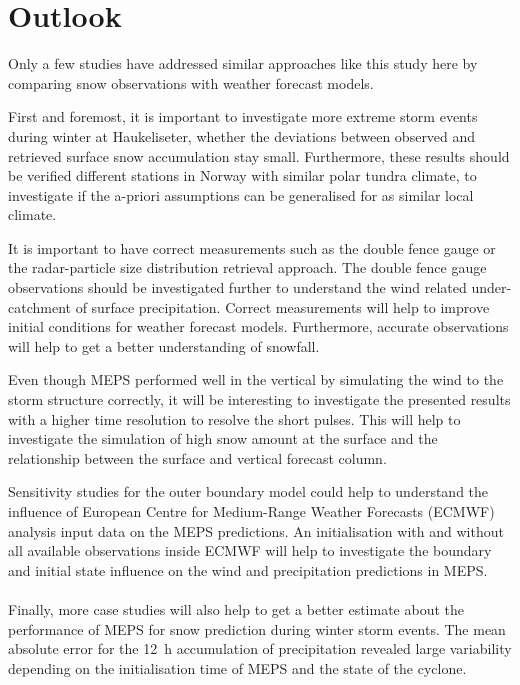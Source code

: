 \section{Outlook}
Only a few studies have addressed similar approaches like this study here by comparing snow observations with weather forecast models. 
\par\medskip
\noindent
First and foremost, it is important to investigate more extreme storm events during winter at Haukeliseter, whether the deviations between observed and retrieved surface snow accumulation stay small. Furthermore, these results should be verified different stations in Norway with similar polar tundra climate, to investigate if the a-priori assumptions can be generalised for as similar local climate. 
\par\medskip
\noindent
It is important to have correct measurements such as the double fence gauge or the radar-particle size distribution retrieval approach. The double fence gauge observations should be investigated further to understand the wind related under-catchment of surface precipitation. Correct measurements will help to improve initial conditions for weather forecast models. %
Furthermore, accurate observations will help to get a better understanding of snowfall.
\par\medskip
\noindent
Even though MEPS performed well in the vertical by simulating the wind to the storm structure correctly, it will be interesting to investigate the presented results with a higher time resolution to resolve the short pulses. %
This will help to investigate the simulation of high snow amount at the surface and the relationship between the surface and vertical forecast column.
\par\medskip
\noindent
Sensitivity studies for the outer boundary model could help to understand the influence of European Centre for Medium-Range Weather Forecasts (ECMWF) analysis input data on the MEPS predictions. An initialisation with and without all available observations inside ECMWF will help to investigate the boundary and initial state influence on the wind and precipitation predictions in MEPS.
\\
\\
Finally, more case studies will also help to get a better estimate about the performance of MEPS for snow prediction during winter storm events. The mean absolute error for the \SI{12}{\hour} accumulation of precipitation revealed large variability depending on the initialisation time of MEPS and the state of the cyclone.

